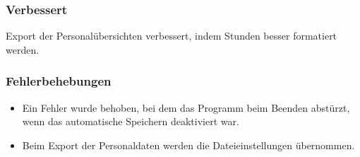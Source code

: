 \subsubsection{Verbessert}
Export der Personalübersichten verbessert, indem Stunden besser formatiert werden.

\subsubsection{Fehlerbehebungen}
\begin{itemize}
  \item
  Ein Fehler wurde behoben, bei dem das Programm beim Beenden abstürzt, wenn das automatische Speichern deaktiviert war.
  \item
  Beim Export der Personaldaten werden die Dateieinstellungen übernommen.
\end{itemize}
